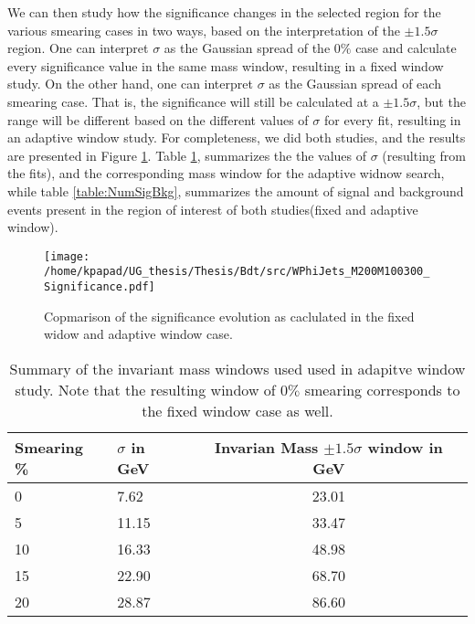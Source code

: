 We can then study how the significance changes in the selected region for the various smearing cases in two ways, based on the interpretation of the \(\pm 1.5\sigma\) region. One can interpret \(\sigma\) as the Gaussian spread of the \(0\%\) case and calculate every significance value in the same mass window, resulting in a fixed window study. On the other hand, one can interpret \(\sigma\) as the Gaussian spread of each smearing case. That is, the significance will still be calculated at a \(\pm 1.5\sigma\), but the range will be different based on the different values of \(\sigma\) for every fit, resulting in an adaptive window study. For completeness, we did both studies, and the results are presented in Figure \ref{fig:AdaFixedSig}. Table \ref{table:AdaSigmas}, summarizes the the values of \(\sigma\) (resulting from the fits), and the corresponding mass window for the adaptive widnow search, while table \ref{table:NumSigBkg}, summarizes the amount of signal and background events present in the region of interest of both studies(fixed and adaptive window).
\begin{figure}[h]
\centering
\texttt{[image: /home/kpapad/UG\_thesis/Thesis/Bdt/src/WPhiJets\_M200M100300\_Significance.pdf]}
\caption{Copmarison of the significance evolution as caclulated in the fixed widow and adaptive window case.} 
\label{fig:AdaFixedSig}
\end{figure}
\begin{table}[htbp]
\centering
\begin{tabular}{|p{2cm}|p{2cm}|c|}
 \hline
Smearing \%  & $\sigma$ in GeV & Invarian Mass $\pm 1.5\sigma$ window  in GeV \\
\hline
0 & 7.62 & 23.01\\
5 & 11.15 & 33.47 \\ 
10 & 16.33 & 48.98 \\ 
15 & 22.90 & 68.70 \\ 
20 & 28.87 & 86.60 \\ 
 \hline
\end{tabular}
\caption{Summary of the invariant mass windows used used in adapitve window study. Note that the resulting window of $0\%$ smearing corresponds to the fixed window case as well.}
\label{table:AdaSigmas}
\end{table}
